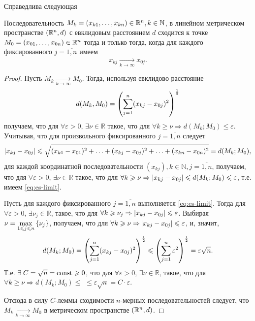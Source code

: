 Справедлива следующая
\begin{theorem}
	Последовательность $M_k = (x_{k1}, \ldots, x_{kn}) \in \mathbb{R}^n, k \in \mathbb{N}$, в линейном метрическом
	пространстве $(\mathbb{R}^n, d)$ с евклидовым расстоянием $d$ сходится к точке ${M_0 = (x_{01}, \ldots, x_{0n}) \in \mathbb{R}^n}$
	тогда и только тогда, когда для каждого фиксированного $j = \overline{1, n}$ имеем
	\begin{equation}
		\label{eq:es-limit}
		x_{kj} \xrightarrow[k \to \infty]{} x_{0j}.
	\end{equation}
\end{theorem}
\begin{proof}
	\circled{$\Rightarrow$} Пусть $M_k \xrightarrow[k \to \infty]{} M_0$. Тогда, используя евклидово
	расстояние
	\begin{equation*}
		d(M_k, M_0) = \left( \sum_{j = 1}^{n}(x_{kj} - x_{0j})^2 \right)^{\frac{1}{2}}
	\end{equation*}
	получаем, что для ${\forall \varepsilon > 0}$, ${\exists \nu \in \mathbb{R}}$ такое, что для
	${\forall k \geqslant \nu \Rightarrow d(M_k; M_0) \leqslant \varepsilon}$. Учитывая, что для
	произвольного фиксированного $j = \overline{1, n}$ следует
	\begin{equation*}
		\left\lvert x_{kj} - x_{0j} \right\rvert \leqslant \sqrt{(x_{k1} - x_{01})^2 + \ldots + (x_{kj} - x_{0j})^2 + \ldots +
		  (x_{kn} - x_{0n})^2} = d(M_k; M_0),
	\end{equation*}
	для каждой координатной последовательности $(x_{kj}), k \in \mathbb{N}, j = \overline{1, n}$,
	получаем, что для ${\forall \varepsilon > 0}$, ${\exists \nu \in \mathbb{R}}$ такое, что для
	${\forall k \geqslant \nu \Rightarrow \left\lvert x_{kj} - x_{0j} \right\rvert \leqslant d(M_k; M_0)
	  \leqslant \varepsilon}$, т.е. имеем \eqref{eq:es-limit}.

	\circled{$\Leftarrow$} Пусть для каждого фиксированного $j = \overline{1, n}$ выполняется
	\eqref{eq:es-limit}. Тогда для ${\forall \varepsilon > 0}$, ${\exists \nu_j \in \mathbb{R}}$,
	такое, что для ${\forall k \geqslant \nu_j \Rightarrow \left\lvert x_{kj} - x_{0j} \right\rvert \leqslant \varepsilon}$. Выбирая
	$\nu = \underset{1 \leqslant j \leqslant n}{\max} \left\{ \nu_j \right\}$, получаем, что для ${\forall k \geqslant \nu \Rightarrow
	} \left\lvert x_{kj} - x_{0j} \right\rvert \leqslant \varepsilon$,
  и, значит,
  \begin{equation*}
	  d(M_k; M_0) = \left( \sum_{j = 1}^{n}(x_{kj} - x_{0j})^2 \right)^{\frac{1}{2}} \leqslant
	  \left( \sum_{j = 1}^{n}\varepsilon^2 \right)^{\frac{1}{2}} = \varepsilon \sqrt{n}.
  \end{equation*}
  Т.е. $\exists\; C = \sqrt{n} = \operatorname{\text{const}} \geqslant 0$, что для ${\forall \varepsilon > 0}$, ${\exists \nu \in \mathbb{R}}$,
  такое, что для ${\forall k \geqslant \nu \Rightarrow d(M_k; M_0) \leqslant}$
  ${\leqslant \varepsilon \sqrt{n} = C \cdot \varepsilon}$.

  Отсюда в силу $C$-леммы сходимости $n$-мерных последовательностей следует, что \\
  ${M_k \xrightarrow[k \to \infty]{}{M_0}}$ в метрическом пространстве $(\mathbb{R}^n, d)$.
\end{proof}

